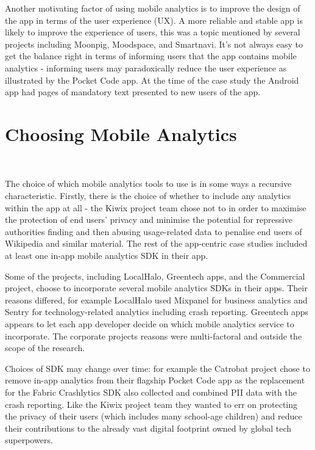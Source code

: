 Another motivating factor of using mobile analytics is to improve the design of the app in terms of the user experience (UX). A more reliable and stable app is likely to improve the experience of users, this was a topic mentioned by several projects including Moonpig, Moodspace, and Smartnavi. It's not always easy to get the balance right in terms of informing users that the app contains mobile analytics - informing users may paradoxically reduce the user experience as illustrated by the Pocket Code app. At the time of the case study the Android app had pages of mandatory text presented to new users of the app.



\section{Choosing Mobile Analytics}~\label{aiu-choosing-mobile-analytics-section}

The choice of which mobile analytics tools to use is in some ways a recursive characteristic. Firstly, there is the choice of whether to include any analytics within the app at all - the Kiwix project team chose not to in order to maximise the protection of end users' privacy and minimise the potential for repressive authorities finding and then abusing usage-related data to penalise end users of Wikipedia and similar material. The rest of the app-centric case studies included at least one in-app mobile analytics SDK in their app.

Some of the projects, including LocalHalo, Greentech apps, and the Commercial project, choose to incorporate several mobile analytics SDKs in their apps. Their reasons differed, for example LocalHalo used Mixpanel for business analytics and Sentry for technology-related analytics including crash reporting. Greentech apps appears to let each app developer decide on which mobile analytics service to incorporate. The corporate projects reasons were multi-factoral and outside the scope of the research.

Choices of SDK may change over time: for example the Catrobat project chose to remove in-app analytics from their flagship Pocket Code app as the replacement for the Fabric Crashlytics SDK also collected and combined PII data with the crash reporting. Like the Kiwix project team they wanted to err on protecting the privacy of their users (which includes many school-age children) and reduce their contributions to the already vast digital footprint owned by global tech superpowers.

